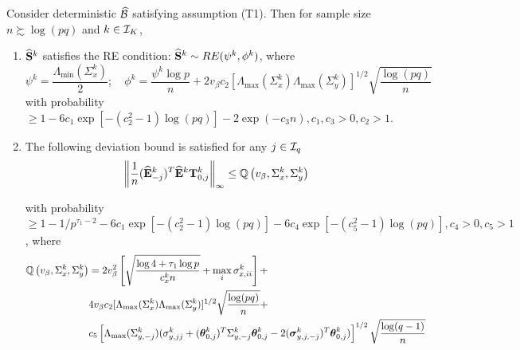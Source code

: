 \documentclass[12pt, letterpaper]{article}
\numberwithin{equation}{section}
\begin{document}

\begin{Proposition}\label{prop:ErrorRE}
Consider deterministic $\widehat {{\cal{B}}}$ satisfying assumption (T1). Then for sample size $n \succsim \log (pq)$ and $k \in {\cal{I}}_K$,

\begin{enumerate}
%
\item $\widehat {{\mathbf{S}}}^k$ satisfies the RE condition: $ \widehat {{\mathbf{S}}}^k \sim RE (\psi^k, \phi^k)$, where 
%
$$
\psi^k = \frac{ \Lambda_{\min} (\Sigma_x^k)}{2}; \quad \phi^k = \frac{ \psi^k \log p}{n} + 2 v_\beta c_2 [ \Lambda_{\max} (\Sigma_x^k) \Lambda_{\max} (\Sigma_y^k) ]^{1/2} \sqrt{\frac{ \log(pq)}{n}}
$$
%
with probability $\geq 1 - 6c_1 \exp [-(c_2^2-1) \log(pq)] - 2 \exp (- c_3 n), c_1, c_3 > 0, c_2 > 1$.
%
\item The following deviation bound is satisfied for any $j \in {\cal{I}}_q$
%
%
$$
\left\|\frac{1}{n} (\widehat {{\mathbf{E}}}_{-j}^k)^T \widehat {{\mathbf{E}}}^k {\mathbf{T}}_{0,j}^k \right\|_\infty \leq {\mathbb{Q}} \left(v_\beta, \Sigma_x^k, \Sigma_y^k \right)
$$
%

with probability $\geq 1 - 1/p^{\tau_1-2} - 6c_1 \exp [-(c_2^2-1) \log(pq)] - 6c_4 \exp [-(c_5^2-1) \log(pq)], c_4 > 0, c_5 > 1$, where
%
\begin{align*}
{\mathbb{Q}} \left(v_\beta, \Sigma_x^k, \Sigma_y^k \right) &=
2 v_\beta^2 \left[ \sqrt{ \frac{ \log 4 + \tau_1 \log p}{c_x^k n}} + \max_i \sigma_{x,ii}^k \right] +\\
& 4 v_\beta c_2 [ \Lambda_{\max} (\Sigma_x^k) \Lambda_{\max} (\Sigma_y^k) ]^{1/2} \sqrt{\frac{ \log(pq)}{n}} +\\
& c_5 \left[ \Lambda_{\max} ( \Sigma_{y,-j}^k) ( \sigma_{y,jj}^k +
({\boldsymbol{\theta}}_{0,j}^k)^T \Sigma_{y,-j}^k {\boldsymbol{\theta}}_{0,j}^k - 2 ({\boldsymbol{\sigma}}_{y,j,-j}^k)^T {\boldsymbol{\theta}}_{0,j}^k ) \right]^{1/2} \sqrt{\frac{\log(q-1)}{n}}
\end{align*}
%
\end{enumerate} 
\end{Proposition}
\end{document}
